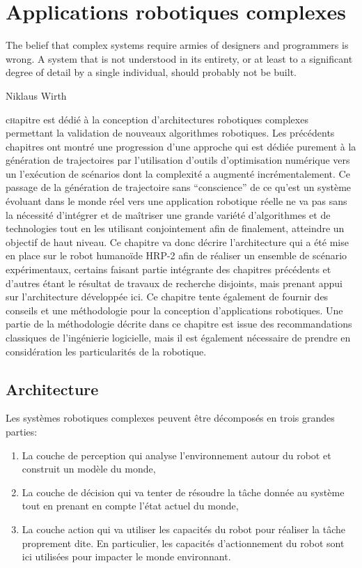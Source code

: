 \chapter{Applications robotiques complexes}
\label{chap:integration}

\epigraph{The belief that complex systems require armies of designers
  and programmers is wrong. A system that is not understood in its
  entirety, or at least to a significant degree of detail by a single
  individual, should probably not be built.}{Niklaus Wirth}
\clearpage

\lettrine[lines=2, lraise=0.1, nindent=0em, slope=-.5em]%
chapitre est dédié à la conception d'architectures robotiques
complexes permettant la validation de nouveaux algorithmes robotiques.
Les précédents chapitres ont montré une progression d'une approche qui
est dédiée purement à la génération de trajectoires par l'utilisation
d'outils d'optimisation numérique vers un l'exécution de scénarios
dont la complexité a augmenté incrémentalement. Ce passage de la
génération de trajectoire sans ``conscience'' de ce qu'est un système
évoluant dans le monde réel vers une application robotique réelle ne
va pas sans la nécessité d'intégrer et de maîtriser une grande variété
d'algorithmes et de technologies tout en les utilisant conjointement
afin de finalement, atteindre un objectif de haut niveau. Ce chapitre
va donc décrire l'architecture qui a été mise en place sur le robot
humanoïde HRP-2 afin de réaliser un ensemble de scénario
expérimentaux, certains faisant partie intégrante des chapitres
précédents et d'autres étant le résultat de travaux de recherche
disjoints, mais prenant appui sur l'architecture développée ici. Ce
chapitre tente également de fournir des conseils et une méthodologie
pour la conception d'applications robotiques. Une partie de la
méthodologie décrite dans ce chapitre est issue des recommandations
classiques de l'ingénierie logicielle, mais il est également
nécessaire de prendre en considération les particularités de la
robotique.

\section{Architecture}


Les systèmes robotiques complexes peuvent être décomposés en trois
grandes parties:

\begin{enumerate}
\item La couche de perception qui analyse
  l'environnement autour du robot et construit un modèle du monde,
\item La couche de décision qui va tenter de résoudre
  la tâche donnée au système tout en prenant en compte l'état actuel
  du monde,
\item La couche action qui va utiliser les capacités du robot pour
  réaliser la tâche proprement dite. En particulier, les capacités
  d'actionnement du robot sont ici utilisées pour impacter le monde
  environnant.
\end{enumerate}


